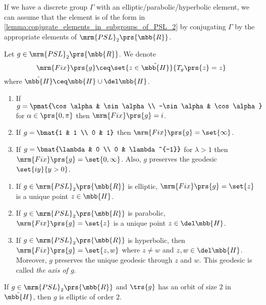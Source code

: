 \documentclass[10pt, twoside]{book}
\begin{document}
\begin{remark}
If we have a discrete group $\Gamma$ with an elliptic/parabolic/hyperbolic element, we can assume that the element is of the form in \ref{lemma:conjugate_elements_in_subgroups_of_PSL_2} by conjugating $\Gamma$ by the appropriate elements of $\mrm{PSL}_2\prs{\mbb{R}}$.
\end{remark}

\begin{notation}
Let $g \in \mrm{PSL}_2\prs{\mbb{R}}$. We denote
\[\mrm{Fix}\prs{g} \ceq \set{z \in \tilde{\mbb{H}}}{T_g\prs{z} = z}\]
where $\tilde{\mbb{H}} \ceq \mbb{H} \cup \del \mbb{H}$.
\end{notation}

\begin{lemma}
\begin{enumerate}
\item If $g = \pmat{\cos \alpha & \sin \alpha \\ -\sin \alpha & \cos \alpha}$ for $\alpha \in \prs{0,\pi}$ then $\mrm{Fix}\prs{g} = i$.
\item
If $g = \bmat{1 & 1 \\ 0 & 1}$ then
$\mrm{Fix}\prs{g} = \set{\infty}$.
\item If $g = \bmat{\lambda & 0 \\ 0 & \lambda^{-1}}$ for $\lambda > 1$ then $\mrm{Fix}\prs{g} = \set{0, \infty}$. Also, $g$ preserves the geodesic $\set{iy}{y > 0}$.
\end{enumerate}
\end{lemma}

\begin{corollary}
\begin{enumerate}
\item If $g \in \mrm{PSL}_2\prs{\mbb{R}}$ is elliptic, $\mrm{Fix}\prs{g} = \set{z}$ is a unique point $z \in \mbb{H}$.
\item If $g \in \mrm{PSL}_2\prs{\mbb{R}}$ is parabolic, $\mrm{Fix}\prs{g} = \set{z}$ is a unique point $z \in \del \mbb{H}$.
\item If $g \in \mrm{PSL}_2\prs{\mbb{R}}$ is hyperbolic, then $\mrm{Fix}\prs{g} = \set{z,w}$ where $z \neq w$ and $z,w \in \del \mbb{H}$. Moreover, $g$ preserves the unique geodesic through $z$ and $w$. This geodesic is called \emph{the axis of $g$}. 
\end{enumerate}
\end{corollary}

\begin{exercise}
If $g \in \mrm{PSL}_2\prs{\mbb{R}}$ and $\trs{g}$ has an orbit of size $2$ in $\tilde{\mbb{H}}$, then $g$ is elliptic of order $2$.
\end{exercise}
\end{document}
